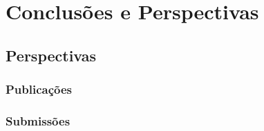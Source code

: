 \chapter{Conclus\~{o}es e Perspectivas}


\section*{Perspectivas}


\subsection*{Publica\c{c}\~{o}es}



\subsection*{Submiss\~{o}es}


